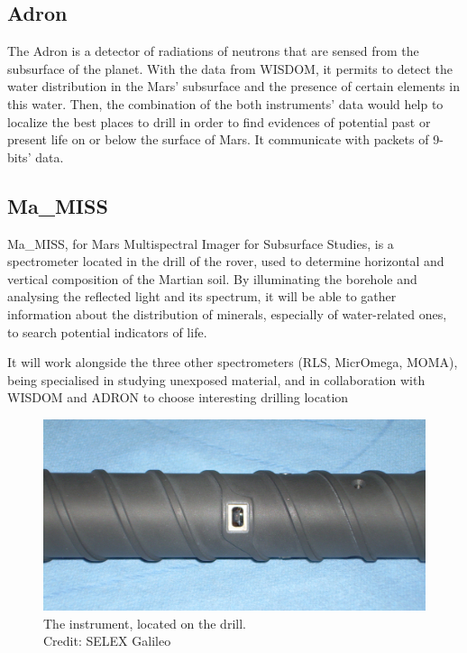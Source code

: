 \documentclass[12pt,a4paper]{article}
\begin{document}
\subsection{Adron}

The Adron is a detector of radiations of neutrons that are sensed from the subsurface of the planet. With the data from WISDOM, it permits to detect the water distribution in the Mars' subsurface and the presence of certain elements in this water. Then, the combination of the both instruments' data would help to localize the best places to drill in order to find evidences of potential past or present life on or below the surface of Mars. It communicate with packets of 9-bits' data.

\pagebreak
\subsection{Ma\_MISS}
Ma\_MISS, for Mars Multispectral Imager for Subsurface Studies, is a spectrometer located in the drill of the rover, used to determine horizontal and vertical composition of the Martian soil. By illuminating the borehole and analysing the reflected light and its spectrum, it will be able to gather information about the distribution of minerals, especially of water-related ones, to search potential indicators of life.

It will work alongside the three other spectrometers (RLS, MicrOmega, MOMA), being specialised in studying unexposed material, and in collaboration with WISDOM and ADRON to choose interesting drilling location

\begin{figure}[h]
\centering
\includegraphics[scale=.7]{pictures/MaMiss}
\caption{The instrument, located on the drill.\\Credit: SELEX Galileo}
\end{figure}
\end{document}
